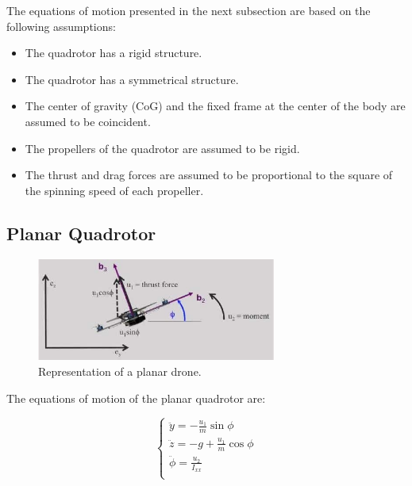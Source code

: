 \documentclass{thesisreport}
\begin{document}
The equations of motion presented in the next subsection are based on the following assumptions:

\begin{itemize}
	\item The quadrotor has a rigid structure.
	\item The quadrotor has a symmetrical structure.
	\item The center of gravity (CoG) and the fixed frame at the center of the body are assumed to be coincident.
	\item The propellers of the quadrotor are assumed to be rigid.
	\item The thrust and drag forces are assumed to be proportional to the square of the spinning speed of each propeller.
\end{itemize}




















\subsection{Planar Quadrotor}\label{subsec:planar_quadrotor}

\begin{figure}[h]
	\centering
	\includegraphics[width=0.7\textwidth]{Images/dynamics/planar_quadrotor.jpg}
	\caption{Representation of a planar drone. \cite{planar_quadrotor_figure}}
\end{figure}

The equations of motion of the planar quadrotor are:

\begin{equation}\label{dynamics_planar_quadrotor}
 \begin{cases} 
       \ddot{y} = - \frac{u_1}{m} \sin{\phi} \\
       \ddot{z} = - g + \frac{u_1}{m} \cos{\phi} \\
       \ddot{\phi} = \frac{u_2}{I_{xx}} \\
   \end{cases}
\end{equation}
\end{document}
